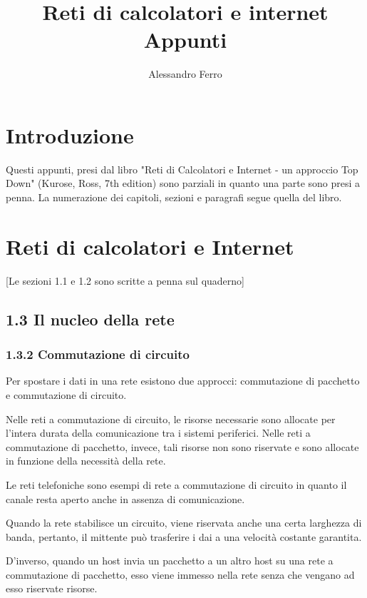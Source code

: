 \documentclass{book}
\title{%
	Reti di calcolatori e internet\\
	\small Appunti}
\author{Alessandro Ferro}
\date{}
\begin{document}
\maketitle
	
\chapter*{Introduzione}
Questi appunti, presi dal libro "Reti di Calcolatori e Internet - un approccio Top Down" (Kurose, Ross, 7th edition) sono parziali in quanto una parte sono presi a penna. La numerazione dei capitoli, sezioni e paragrafi segue quella del libro.

\tableofcontents %
		
\chapter{Reti di calcolatori e Internet}
	
[Le sezioni 1.1 e 1.2 sono scritte a penna sul quaderno]
	
\section*{1.3 Il nucleo della rete}
	
\subsection*{1.3.2 Commutazione di circuito}
Per spostare i dati in una rete esistono due approcci: commutazione di pacchetto e commutazione di circuito. 
	
Nelle reti a commutazione di circuito, le risorse necessarie sono allocate per l'intera durata della comunicazione tra i sistemi periferici. Nelle reti a commutazione di pacchetto, invece, tali risorse non sono riservate e sono allocate in funzione della necessità della rete.
	
Le reti telefoniche sono esempi di rete a commutazione di circuito in quanto il canale resta aperto anche in assenza di comunicazione.
	
Quando la rete stabilisce un circuito, viene riservata anche una certa larghezza di banda, pertanto, il mittente può trasferire i dai a una velocità costante garantita.
	
D'inverso, quando un host invia un pacchetto a un altro host su una rete a commutazione di pacchetto, esso viene immesso nella rete senza che vengano ad esso riservate risorse.
	
\end{document}
